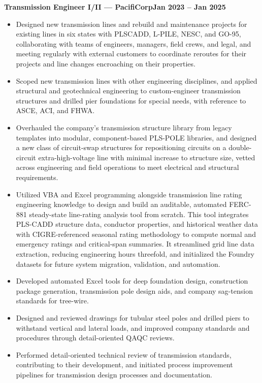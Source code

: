 \documentclass[10pt, letterpaper]{article}
\newcommand{\jobline}[2]{%
  \vspace{5pt}%
  \noindent\textbf{#1}\hfill\textbf{#2}\par%
  \vspace{1pt}%
}
\newenvironment{rlist}{%
  \begin{itemize}[leftmargin=1.4em, itemsep=1pt, topsep=2pt, parsep=0pt]%
}{%
  \end{itemize}%
}
\begin{document}
\jobline{Transmission Engineer I/II --- PacifiCorp}{Jan 2023 -- Jan 2025}
\begin{rlist}
  \item Designed new transmission lines and rebuild and maintenance projects for existing lines in six states with PLSCADD, L-PILE, NESC, and GO-95, collaborating with teams of engineers, managers, field crews, and legal, and meeting regularly with external customers to coordinate reroutes for their projects and line changes encroaching on their properties.
  \item Scoped new transmission lines with other engineering disciplines, and applied structural and geotechnical engineering to custom-engineer transmission structures and drilled pier foundations for special needs, with reference to ASCE, ACI, and FHWA.
  \item Overhauled the company's transmission structure library from legacy templates into modular, component-based PLS-POLE libraries, and designed a new class of circuit-swap structures for repositioning circuits on a double-circuit extra-high-voltage line with minimal increase to structure size, vetted across engineering and field operations to meet electrical and structural requirements.
  \item Utilized VBA and Excel programming alongside transmission line rating engineering knowledge to design and build an auditable, automated FERC-881 steady-state line-rating analysis tool from scratch. This tool integrates PLS-CADD structure data, conductor properties, and historical weather data with CIGRE-referenced seasonal rating methodology to compute normal and emergency ratings and critical-span summaries. It streamlined grid line data extraction, reducing engineering hours threefold, and initialized the Foundry datasets for future system migration, validation, and automation.
  \item Developed automated Excel tools for deep foundation design, construction package generation, transmission pole design aids, and company sag-tension standards for tree-wire.
  \item Designed and reviewed drawings for tubular steel poles and drilled piers to withstand vertical and lateral loads, and improved company standards and procedures through detail-oriented QAQC reviews.
  \item Performed detail-oriented technical review of transmission standards, contributing to their development, and initiated process improvement pipelines for transmission design processes and documentation.
\end{rlist}
\end{document}
